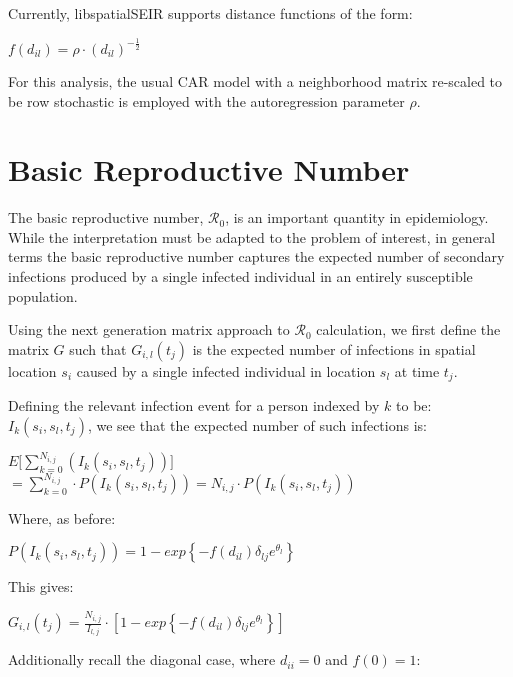 \documentclass[12pt]{article}
\newcommand \mbreak {\\ \vspace{0.1in}}
\begin{document}
Currently, libspatialSEIR supports distance functions of the form:

\begin{center}
    $f(d_{il}) = \rho \cdot (d_{il})^{-\frac{1}{2}}$
\end{center}

For this analysis, the usual CAR model with a neighborhood matrix re-scaled to be row stochastic is employed with the autoregression 
parameter $\rho$.

 
\section{Basic Reproductive Number}
The basic reproductive number, $\mathcal{R}_0$, is an important quantity in epidemiology. While the interpretation must be adapted to 
the problem of interest, in general terms the basic reproductive number captures the expected number of secondary 
infections produced by a single infected individual in an entirely susceptible population. 

Using the next generation matrix approach to $\mathcal{R}_0$ calculation, we first define the matrix $G$ such 
that $G_{i,l}(t_j)$ is the expected number of infections in spatial location $s_i$ caused by a single infected
individual in location $s_l$ at time $t_j$.

Defining the relevant infection event for a person indexed by $k$ to be: $I_k(s_i, s_l, t_j)$, we see that the expected number of such
infections is:

\begin{center}
    $\displaystyle E\big[ \sum_{k=0}^{N_{i,j}}(I_k(s_i, s_l, t_j)) \big]$ \mbreak
    $\displaystyle = \sum_{k=0}^{N_{i,j}}\cdot P(I_k(s_i, s_l, t_j)) = N_{i,j}\cdot P(I_k(s_i, s_l, t_j)) $ \mbreak 
\end{center}

    Where, as before: \mbreak

\begin{center}
    $ P(I_k(s_i, s_l, t_j)) = 1-exp\left\{-f(d_{il})\delta_{lj}e^{\theta_{l}} \right\}$ \mbreak
\end{center}

    This gives: \mbreak

\begin{center}
    $G_{i,l}(t_j) = \frac{N_{i,j}}{I_{l,j}}\cdot \left[1-exp\left\{-f(d_{il})\delta_{lj}e^{\theta_{l}} \right\}\right]$ \mbreak
\end{center}

    Additionally recall the diagonal case, where $d_{ii} = 0$ and $f(0) = 1$:\mbreak 
\end{document}
